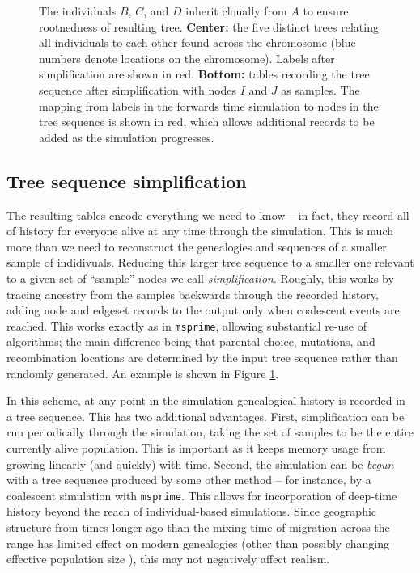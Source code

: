 \documentclass{article}
\newcommand{\msprime}{\texttt{msprime}}
\begin{document}
\begin{figure}
{        The individuals $B$, $C$, and $D$ inherit clonally from $A$
        to ensure rootnedness of resulting tree.
        \textbf{Center:} the five distinct trees relating all individuals to each other
        found across the chromosome (blue numbers denote locations on the chromosome).
        Labels after simplification are shown in red.
        \textbf{Bottom:} tables recording the tree sequence after simplification
        with nodes $I$ and $J$ as samples.
        The mapping from labels in the forwards time simulation to nodes in the tree sequence
        is shown in red,
        which allows additional records to be added as the simulation progresses.
        \label{fig:method_diagram}
    }
\end{figure}


\subsection*{Tree sequence simplification}

The resulting tables encode everything we need to know --
in fact, they record all of history for everyone alive at any time through the simulation.
This is much more than we need to reconstruct the genealogies and sequences
of a smaller sample of indidivuals.
Reducing this larger tree sequence to a smaller one relevant to a given set of ``sample'' nodes
we call \emph{simplification}.
Roughly, this works by tracing ancestry from the samples backwards through the recorded history,
adding node and edgeset records to the output only when coalescent events are reached.
This works exactly as in \msprime, allowing substantial re-use of algorithms;
the main difference being that parental choice, mutations, and recombination locations
are determined by the input tree sequence
rather than randomly generated.
An example is shown in Figure \ref{fig:method_diagram}.

In this scheme,
at any point in the simulation genealogical history is recorded in a tree sequence.
This has two additional advantages.
First, simplification can be run periodically through the simulation,
taking the set of samples to be the entire currently alive population.
This is important as it keeps memory usage from growing linearly (and quickly) with time.
Second, the simulation can be \emph{begun} with a tree sequence produced by some other method --
for instance, by a coalescent simulation with \msprime.
This allows for incorporation of deep-time history beyond the reach of individual-based simulations.
Since geographic structure from times longer ago than the mixing time of migration across the range
has limited effect on modern genealogies \citep{wilkins_separation}
(other than possibly changing effective population size \citet{durretspatial}),
this may not negatively affect realism.
\end{document}
